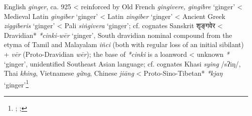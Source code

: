 \begin{etymology}\label{ety:ginger}
English \textit{ginger}, ca. 925
< reinforced by Old French \textit{gingivere, gingibre } `ginger'
< Medieval Latin \textit{gingiber} `ginger'
< Latin \textit{zingiber} `ginger'
< Ancient Greek {} \textit{ziggiberis} `ginger'
< Pali \textit{siṅgivera } `ginger'; cf. cognates Sanskrit शृङ्गवेर 
< Dravidian* \textit{*cinki-wēr} `ginger', South dravidian nominal compound  from the etyma of Tamil and Malayalam \textit{iñci} (both with regular loss of an initial sibilant) + \textit{vēr} (Proto-Dravidian \textit{wēr}); the base of \textit{*cinki} is a loanword
< unknown \textit{*} `ginger', unidentified Southeast Asian language; cf. cognates Khasi \textit{sying} /sʔiŋ/, Thai \textit{khing}, Vietnamese \textit{gừng}, Chinese \textit{jiāng}
< Proto-Sino-Tibetan* \textit{*kjaŋ} `ginger'\footnote{\textcite{oed; ross_ginger_1952}; \textcite[5]{krishnamurti_dravidian_2003}; }
\end{etymology}
